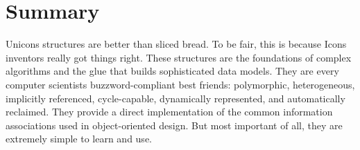 
\section*{Summary}

Unicon{\textquotesingle}s structures are better than sliced bread. To be
fair, this is because Icon{\textquotesingle}s inventors really got
things right. These structures are the foundations of complex
algorithms and the glue that builds sophisticated data models. They are
every computer scientists{\textquotesingle} buzzword-compliant best
friends: polymorphic, heterogeneous, implicitly referenced,
cycle-capable, dynamically represented, and automatically reclaimed.
They provide a direct implementation of the common information
associations used in object-oriented design. But most important of all,
they are extremely simple to learn and use.


\bigskip

\clearpage
\bigskip
